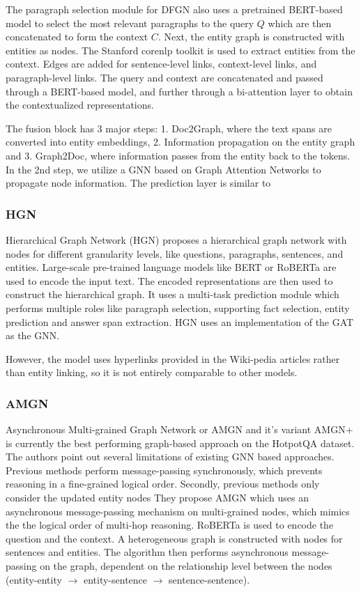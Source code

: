 \documentclass[sigplan,screen]{acmart}
\begin{document}
The paragraph selection module for DFGN also uses a pretrained BERT-based model \cite{RN153} to select the most relevant paragraphs to the 
query $Q$ which are then concatenated to form the context $C$. Next, the entity graph is constructed with entities as nodes. The Stanford 
corenlp toolkit \cite{RN170} is used to extract entities from the context. Edges are added for sentence-level links, context-level links, 
and paragraph-level links. The query and context are concatenated and passed through a BERT-based model, and further through a bi-attention 
layer to obtain the contextualized representations.

The fusion block has 3 major steps: 1. Doc2Graph, where the text spans are converted into entity embeddings, 2. Information propagation on 
the entity graph and 3. Graph2Doc, where information passes from the entity back to the tokens. In the 2nd step, we utilize a GNN based on 
Graph Attention Networks \cite{RN7} to propagate node information. The prediction layer is similar to \cite{RN116}

\subsubsection{HGN}
Hierarchical Graph Network (HGN) \cite{RN119} proposes a hierarchical graph network with nodes for different granularity levels, like questions, 
paragraphs, sentences, and entities. Large-scale pre-trained language models like BERT \cite{RN153} or RoBERTa \cite{RN171} are used to encode 
the input text. The encoded representations are then used to construct the hierarchical graph. It uses a multi-task prediction module which 
performs multiple roles like paragraph selection, supporting fact selection, entity prediction and answer span extraction. HGN uses an 
implementation of the GAT \cite{RN7} as the GNN.

However, the model uses hyperlinks provided in the Wiki-pedia articles rather than entity linking, so it is not entirely comparable to other 
models.

\subsubsection{AMGN}
Asynchronous Multi-grained Graph Network \cite{RN131} or AMGN and it's variant AMGN+ is currently the best performing graph-based approach on the HotpotQA dataset.
The authors point out several limitations of existing GNN based approaches. Previous methods perform message-passing synchronously,
which prevents reasoning in a fine-grained logical order. Secondly, previous methods only consider the  updated entity nodes
They propose AMGN which uses an asynchronous message-passing mechanism on multi-grained nodes, which mimics the the logical order of multi-hop 
reasoning. RoBERTa \cite{RN171} is used to encode the question and the context. A heterogeneous graph is constructed with nodes for sentences 
and entities. The algorithm then performs asynchronous message-passing on the graph, dependent on the relationship level between the nodes 
(entity-entity $\to$ entity-sentence $\to$ sentence-sentence).
\end{document}
